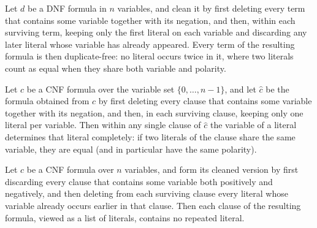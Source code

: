 \begin{lemma}
\label{LMN.cleanDNF_nodup}
\leanok
{}
Let $d$ be a DNF formula in $n$ variables, and clean it by first deleting every term
that contains some variable together with its negation, and then, within each surviving
term, keeping only the first literal on each variable and discarding any later literal
whose variable has already appeared. Every term of the resulting formula is then
duplicate-free: no literal occurs twice in it, where two literals count as equal when
they share both variable and polarity.
\end{lemma}

\begin{lemma}
\label{LMN.cleanCNF_var_inj}
\leanok
{}
Let $c$ be a CNF formula over the variable set $\{0,\dots,n-1\}$, and let $\hat c$ be
the formula obtained from $c$ by first deleting every clause that contains some variable
together with its negation, and then, in each surviving clause, keeping only one literal
per variable. Then within any single clause of $\hat c$ the variable of a literal
determines that literal completely: if two literals of the clause share the same
variable, they are equal (and in particular have the same polarity).
\end{lemma}

\begin{lemma}
\label{LMN.cleanCNF_nodup}
\leanok
{}
Let $c$ be a CNF formula over $n$ variables, and form its cleaned version by first
discarding every clause that contains some variable both positively and negatively, and
then deleting from each surviving clause every literal whose variable already occurs
earlier in that clause. Then each clause of the resulting formula, viewed as a list of
literals, contains no repeated literal.
\end{lemma}

